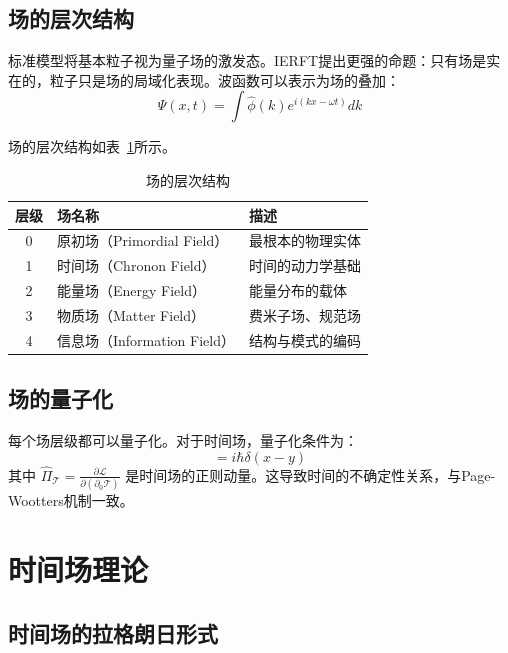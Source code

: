 \documentclass[12pt,a4paper]{article}
\begin{document}
\subsection{场的层次结构}

标准模型将基本粒子视为量子场的激发态。IERFT提出更强的命题：只有场是实在的，粒子只是场的局域化表现。波函数可以表示为场的叠加：
\begin{equation}
\Psi(x,t) = \int \hat{\phi}(k) e^{i(kx-\omega t)} dk
\end{equation}

场的层次结构如表~\ref{tab:field_hierarchy}所示。

\begin{table}[htbp]
\centering
\caption{场的层次结构}
\label{tab:field_hierarchy}
\begin{tabular}{cll}
\toprule
层级 & 场名称 & 描述 \\
\midrule
0 & 原初场（Primordial Field）& 最根本的物理实体 \\
1 & 时间场（Chronon Field）& 时间的动力学基础 \\
2 & 能量场（Energy Field）& 能量分布的载体 \\
3 & 物质场（Matter Field）& 费米子场、规范场 \\
4 & 信息场（Information Field）& 结构与模式的编码 \\
\bottomrule
\end{tabular}
\end{table}

\subsection{场的量子化}

每个场层级都可以量子化。对于时间场，量子化条件为：
\begin{equation}
[\hat{\mathcal{T}}(x), \hat{\Pi}_{\mathcal{T}}(y)] = i\hbar \delta(x-y)
\end{equation}
其中 $\hat{\Pi}_{\mathcal{T}} = \frac{\partial \mathcal{L}}{\partial(\partial_0 \mathcal{T})}$ 是时间场的正则动量。这导致时间的不确定性关系，与Page-Wootters机制一致。

\section{时间场理论}

\subsection{时间场的拉格朗日形式}
\end{document}
